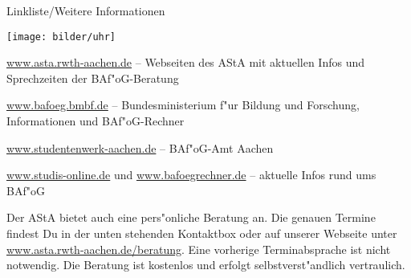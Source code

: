 \begin{artikel}{Linkliste/Weitere Informationen}
\parbox{.1\linewidth}{\texttt{[image: bilder/uhr]}}
\parbox{.9\linewidth}{
\begin{aufzaehlung}
\item \url{www.asta.rwth-aachen.de} -- Webseiten des AStA mit aktuellen Infos und Sprechzeiten der BAf"oG-Beratung
\item \url{www.bafoeg.bmbf.de} -- Bundesministerium f"ur Bildung und Forschung, Informationen und BAf"oG-Rechner
\item \url{www.studentenwerk-aachen.de} -- BAf"oG-Amt Aachen
\item \url{www.studis-online.de} und \url{www.bafoegrechner.de} -- aktuelle Infos rund ums BAf"oG
\end{aufzaehlung}}
\vspace*{1ex}

Der AStA bietet auch eine pers"onliche Beratung an. Die genauen Termine findest Du in der unten stehenden Kontaktbox oder auf unserer Webseite unter \url{www.asta.rwth-aachen.de/beratung}. Eine vorherige Terminabsprache ist nicht notwendig. Die Beratung ist kostenlos und erfolgt selbstverst"andlich vertraulich.
\end{artikel}

